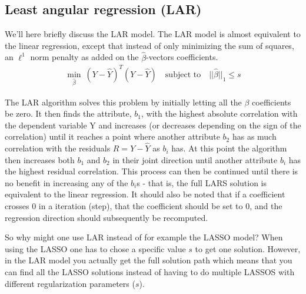 \subsection{Least angular regression (LAR)}
We'll here briefly discuss the LAR model.
The LAR model is almost equivalent to the linear regression, except that instead of only minimizing the sum of squares, an $\ell^1$ norm penalty as added on the $\hat{\beta}$-vectors coefficients.
\begin{align}
\min_{\hat{\beta}}\ (Y - \hat{Y})^T (Y - \hat{Y}) \quad \text{subject to} \quad ||\hat{\beta}||_1 \le s
\end{align}

The LAR algorithm \cite{LAR-algorithm} solves this problem by initially letting all the $\beta$ coefficients be zero.
It then finds the attribute, $b_1$, with the highest absolute correlation with the dependent variable Y and increases (or decreases depending on the sign of the correlation)
until it reaches a point where another attribute $b_2$ has as much  correlation with the residuals $R=Y-\hat{Y}$ as  $b_i$ has.
At this point the algorithm then increases both $b_1$ and $b_2$ in their joint direction until another attribute $b_i$ has the highest residual correlation.
This process can then be continued until there is no benefit in increasing any of the $b_i$s - that is, the full LARS solution is equivalent to the linear regression.
It should also be noted that if a coefficient crosses 0 in a iteration (step),
that the coefficient should be set to 0, and the regression direction should subsequently be recomputed.

So why might one use LAR instead of for example the LASSO model? 
When using the LASSO one has to chose a specific value $s$ to get one solution.
However, in the LAR model you actually get the full solution path which means that you can find all the LASSO solutions instead of having to do multiple LASSOS with different regularization parameters ($s$).

